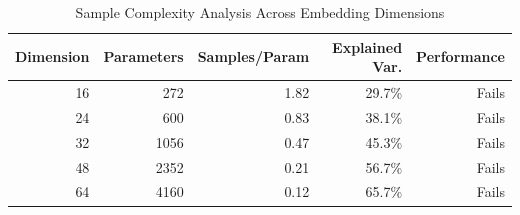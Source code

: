 \begin{table}[t]
\centering
\caption{Sample Complexity Analysis Across Embedding Dimensions}
\label{tab:sample_complexity}
\begin{tabular}{rrrrr}
\toprule
\textbf{Dimension} & \textbf{Parameters} & \textbf{Samples/Param} & \textbf{Explained Var.} & \textbf{Performance} \\
\midrule
16 & 272 & 1.82 & 29.7\% & Fails \\
24 & 600 & 0.83 & 38.1\% & Fails \\
32 & 1056 & 0.47 & 45.3\% & Fails \\
48 & 2352 & 0.21 & 56.7\% & Fails \\
64 & 4160 & 0.12 & 65.7\% & Fails \\
\bottomrule
\end{tabular}
\end{table}
